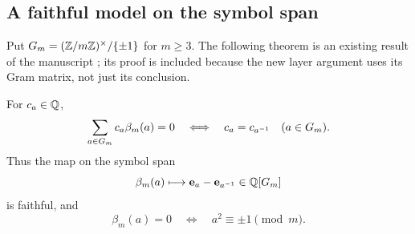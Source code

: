 \subsection{A faithful model on the symbol span}

Put $G_m=(\mathbb Z/m\mathbb Z)^\times/\{\pm1\}$ for $m\ge3$. The following theorem
is an existing result of the manuscript \cite{Repo}; its proof is
included because the new layer argument uses its Gram matrix, not just
its conclusion.

\begin{theorem}\label{thm:kernel}
For $c_a\in\mathbb Q$,
\begin{equation}\label{eq:kernel}
 \sum_{a\in G_m}c_a\beta_m(a)=0
 \quad\Longleftrightarrow\quad c_a=c_{a^{-1}}\quad(a\in G_m).
\end{equation}
Thus the map on the symbol span
\begin{equation}\label{eq:group-model}
 \beta_m(a)\longmapsto \mathbf e_a-\mathbf e_{a^{-1}}\in\mathbb Q[G_m]
\end{equation}
is faithful, and
\begin{equation}\label{eq:beta-zero}
 \beta_m(a)=0\quad\Longleftrightarrow\quad
 a^2\equiv\pm1\pmod m.
\end{equation}
\end{theorem}
